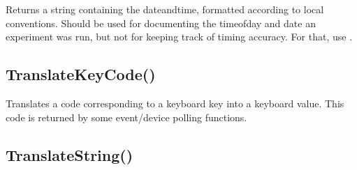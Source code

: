 \documentclass[letterpaper,10pt,english]{sphinxmanual}
\begin{document}
\sphinxAtStartPar
{}

\sphinxAtStartPar
Returns a string containing the date\sphinxhyphen{}and\sphinxhyphen{}time,   formatted according to local conventions. Should be used for   documenting the time\sphinxhyphen{}of\sphinxhyphen{}day and date an experiment was run, but not   for keeping track of timing accuracy.  For that, use   .

\sphinxAtStartPar
{}

\begin{sphinxVerbatim}[commandchars=\\\{\}]
\end{sphinxVerbatim}

\sphinxAtStartPar
{}

\begin{sphinxVerbatim}[commandchars=\\\{\}]
\end{sphinxVerbatim}

\sphinxAtStartPar
{}

\sphinxAtStartPar
{}

\ignorespaces 

\subsection{TranslateKeyCode()}
\label{\detokenize{reference/peblenvironment:translatekeycode}}\label{\detokenize{reference/peblenvironment:index-65}}
\sphinxAtStartPar
{}

\sphinxAtStartPar
{}

\sphinxAtStartPar
Translates a code corresponding to a keyboard key   into a keyboard value.  This code is returned by some event/device   polling functions.

\ignorespaces 

\subsection{TranslateString()}
\label{\detokenize{reference/peblenvironment:translatestring}}\label{\detokenize{reference/peblenvironment:index-66}}
\sphinxAtStartPar
{}
\end{document}
